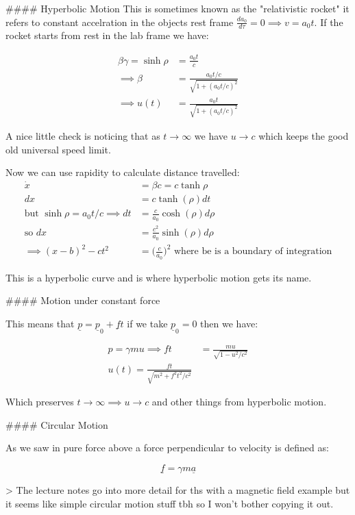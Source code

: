 #### Hyperbolic Motion
This is sometimes known as the "relativistic rocket" it refers to constant accelration in the objects rest frame $\frac{da_0}{d\tau}=0\implies v=a_0t$. If the rocket starts from rest in the lab frame we have:

$$
\begin{aligned}
    \beta\gamma = \sinh\rho &= \frac{a_0t}{c} \\
    \implies \beta &= \frac{a_0t/c}{\sqrt{1+(a_0t/c)^2}}\\
    \implies u(t) &= \frac{a_0t}{\sqrt{1+(a_0t/c)^2}}
\end{aligned}
$$

A nice little check is noticing that as $t\rightarrow\infty$ we have $u\rightarrow c$ which keeps the good old universal speed limit. 

Now we can use rapidity to calculate distance travelled:
$$
\begin{aligned}
    \dot{x} &= \beta c = c\tanh\rho\\
    dx &= c\tanh(\rho) dt\\
    \text{but } \sinh\rho = a_0t/c \implies dt &= \frac{c}{a_0}\cosh(\rho)d\rho\\
    \text{so } dx &= \frac{c^2}{a_0}\sinh(\rho)d\rho\\
    \implies (x-b)^2 - ct^2 &= \bigg(\frac{c}{a_0}\bigg)^2 \text{ where be is a boundary of integration}
\end{aligned}
$$

This is a hyperbolic curve and is where hyperbolic motion gets its name.

#### Motion under constant force

This means that $\underline{p}= \underline{p}_0 + \underline{f}t$ if we take $\underline{p}_0=0$ then we have:

$$
\begin{aligned}
p = \gamma mu \implies ft &= \frac{mu}{\sqrt{1-u^2/c^2}}\\
u(t) = \frac{ft}{\sqrt{m^2 + f^2t^2/c^2}}
\end{aligned}
$$

Which preserves $t\rightarrow\infty \implies u\rightarrow c$ and other things from hyperbolic motion.

#### Circular Motion

As we saw in pure force above a force perpendicular to velocity is defined as:

$$
\underline{f} = \gamma m \underline{a}
$$

> The lecture notes go into more detail for ths with a magnetic field example but it seems like simple circular motion stuff tbh so I won't bother copying it out.


